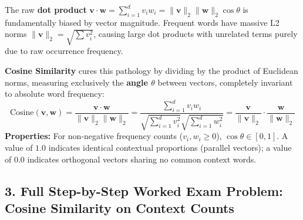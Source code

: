\documentclass[10pt,a4paper]{article}
\begin{document}
\begin{theoremprompt}[title={\textbf{The Vector Length Pathology \& Cosine Similarity Formulation}}]
\footnotesize
The raw \textbf{dot product} $\mathbf{v} \cdot \mathbf{w} = \sum_{i=1}^d v_i w_i = \|\mathbf{v}\|_2 \|\mathbf{w}\|_2 \cos \theta$ is fundamentally biased by vector magnitude. Frequent words have massive L2 norms $\|\mathbf{v}\|_2 = \sqrt{\sum v_i^2}$, causing large dot products with unrelated terms purely due to raw occurrence frequency.

\noindent\textbf{Cosine Similarity} cures this pathology by dividing by the product of Euclidean norms, measuring exclusively the \textbf{angle $\theta$} between vectors, completely invariant to absolute word frequency:
\begin{equation}
    \text{Cosine}(\mathbf{v}, \mathbf{w}) = \frac{\mathbf{v} \cdot \mathbf{w}}{\|\mathbf{v}\|_2 \|\mathbf{w}\|_2} = \frac{\sum_{i=1}^d v_i w_i}{\sqrt{\sum_{i=1}^d v_i^2}\sqrt{\sum_{i=1}^d w_i^2}} = \frac{\mathbf{v}}{\|\mathbf{v}\|_2} \cdot \frac{\mathbf{w}}{\|\mathbf{w}\|_2}
\end{equation}
\textbf{Properties:} For non-negative frequency counts ($v_i, w_i \ge 0$), $\cos \theta \in [0, 1]$. A value of $1.0$ indicates identical contextual proportions (parallel vectors); a value of $0.0$ indicates orthogonal vectors sharing no common context words.
\end{theoremprompt}

\vspace{1pt}
\subsection*{\color{themeblue} 3. Full Step-by-Step Worked Exam Problem: Cosine Similarity on Context Counts}
\vspace{-2pt}
\end{document}

